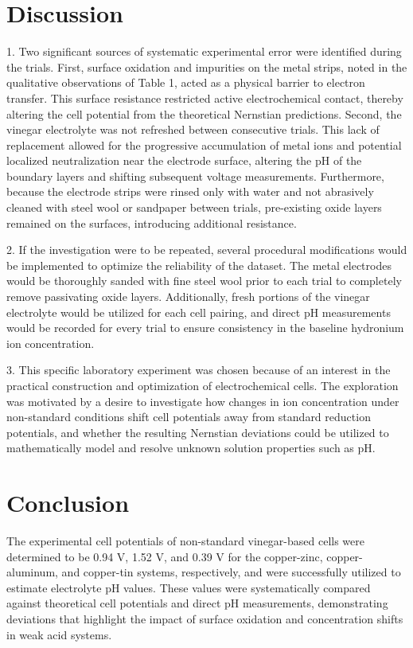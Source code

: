 \documentclass[11pt]{article}
\begin{document}
\section*{Discussion}


1. Two significant sources of systematic experimental error were identified during the trials. First, surface oxidation and impurities on the metal strips, noted in the qualitative observations of Table 1, acted as a physical barrier to electron transfer. This surface resistance restricted active electrochemical contact, thereby altering the cell potential from the theoretical Nernstian predictions. Second, the vinegar electrolyte was not refreshed between consecutive trials. This lack of replacement allowed for the progressive accumulation of metal ions and potential localized neutralization near the electrode surface, altering the pH of the boundary layers and shifting subsequent voltage measurements. Furthermore, because the electrode strips were rinsed only with water and not abrasively cleaned with steel wool or sandpaper between trials, pre-existing oxide layers remained on the surfaces, introducing additional resistance.

2. If the investigation were to be repeated, several procedural modifications would be implemented to optimize the reliability of the dataset. The metal electrodes would be thoroughly sanded with fine steel wool prior to each trial to completely remove passivating oxide layers. Additionally, fresh portions of the vinegar electrolyte would be utilized for each cell pairing, and direct pH measurements would be recorded for every trial to ensure consistency in the baseline hydronium ion concentration.

3. This specific laboratory experiment was chosen because of an interest in the practical construction and optimization of electrochemical cells. The exploration was motivated by a desire to investigate how changes in ion concentration under non-standard conditions shift cell potentials away from standard reduction potentials, and whether the resulting Nernstian deviations could be utilized to mathematically model and resolve unknown solution properties such as pH.

\section*{Conclusion}
The experimental cell potentials of non-standard vinegar-based cells were determined to be 0.94 V, 1.52 V, and 0.39 V for the copper-zinc, copper-aluminum, and copper-tin systems, respectively, and were successfully utilized to estimate electrolyte pH values. These values were systematically compared against theoretical cell potentials and direct pH measurements, demonstrating deviations that highlight the impact of surface oxidation and concentration shifts in weak acid systems.
\end{document}
